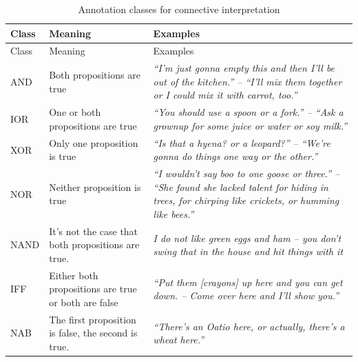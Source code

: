 \documentclass[
  english,
  ,man,floatsintext]{apa6}
\begin{document}
\begin{longtable}[]{@{}
  >{\raggedright\arraybackslash}p{}
  >{\raggedright\arraybackslash}p{}
  >{\raggedright\arraybackslash}p{}@{}}
\caption{\label{tab:connectiveInterpretaion} Annotation classes for connective interpretation}\tabularnewline
\toprule
Class & Meaning & Examples \\
\midrule
\endfirsthead
\toprule
Class & Meaning & Examples \\
\midrule
\endhead
AND & Both propositions are true & \emph{``I'm just gonna empty this and then I'll be out of the kitchen.'' -- ``I'll mix them together or I could mix it with carrot, too.''} \\
IOR & One or both propositions are true & \emph{``You should use a spoon or a fork.'' -- ``Ask a grownup for some juice or water or soy milk.''} \\
XOR & Only one proposition is true & \emph{``Is that a hyena? or a leopard?'' -- ``We're gonna do things one way or the other.''} \\
NOR & Neither proposition is true & \emph{``I wouldn't say boo to one goose or three.'' -- ``She found she lacked talent for hiding in trees, for chirping like crickets, or humming like bees.''} \\
NAND & It's not the case that both propositions are true. & \emph{I do not like green eggs and ham -- you don't swing that in the house and hit things with it} \\
IFF & Either both propositions are true or both are false & \emph{``Put them {[}crayons{]} up here and you can get down. -- Come over here and I'll show you.''} \\
NAB & The first proposition is false, the second is true. & \emph{``There's an Oatio here, or actually, there's a wheat here.''} \\
\bottomrule
\end{longtable}
\end{document}
